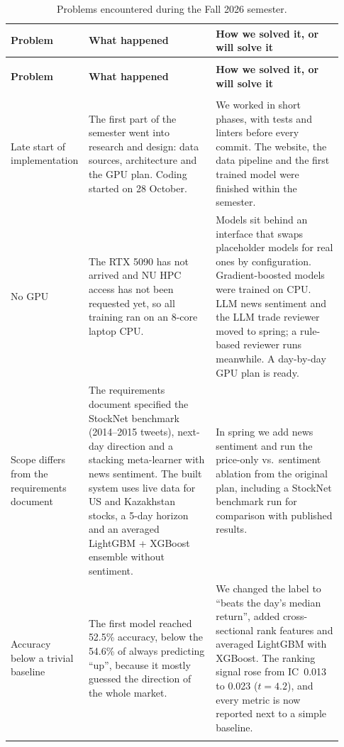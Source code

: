 {\small
\begin{longtable}{@{}>{\raggedright\arraybackslash}p{0.17\linewidth}
                    >{\raggedright\arraybackslash}p{0.38\linewidth}
                    >{\raggedright\arraybackslash}p{0.38\linewidth}@{}}
\caption{Problems encountered during the Fall 2026 semester.}
\label{tab:problems}\\
\toprule
\textbf{Problem} & \textbf{What happened} & \textbf{How we solved it, or will solve it} \\
\midrule
\endfirsthead
\multicolumn{3}{@{}l}{\small\emph{Table~\ref{tab:problems} continued}}\\
\toprule
\textbf{Problem} & \textbf{What happened} & \textbf{How we solved it, or will solve it} \\
\midrule
\endhead
\midrule
\multicolumn{3}{r@{}}{\small\emph{continued on the next page}}\\
\endfoot
\bottomrule
\endlastfoot

Late start of implementation &
The first part of the semester went into research and design: data sources,
architecture and the GPU plan. Coding started on 28 October. &
We worked in short phases, with tests and linters before every commit. The
website, the data pipeline and the first trained model were finished within the
semester. \\
\addlinespace

No GPU &
The RTX 5090 has not arrived and NU HPC access has not been requested yet, so
all training ran on an 8-core laptop CPU. &
Models sit behind an interface that swaps placeholder models for real ones by
configuration. Gradient-boosted models were trained on CPU. LLM news sentiment
and the LLM trade reviewer moved to spring; a rule-based reviewer runs
meanwhile. A day-by-day GPU plan is ready. \\
\addlinespace

Scope differs from the requirements document &
The requirements document specified the StockNet benchmark (2014--2015 tweets),
next-day direction and a stacking meta-learner with news sentiment. The built
system uses live data for US and Kazakhstan stocks, a 5-day horizon and an
averaged LightGBM + XGBoost ensemble without sentiment. &
In spring we add news sentiment and run the price-only vs.\ sentiment ablation
from the original plan, including a StockNet benchmark run for comparison with
published results. \\
\addlinespace

Accuracy below a trivial baseline &
The first model reached 52.5\% accuracy, below the 54.6\% of always predicting
``up'', because it mostly guessed the direction of the whole market. &
We changed the label to ``beats the day's median return'', added
cross-sectional rank features and averaged LightGBM with XGBoost. The ranking
signal rose from IC~0.013 to 0.023 ($t = 4.2$), and every metric is now
reported next to a simple baseline. \\
\addlinespace


\end{longtable}}
